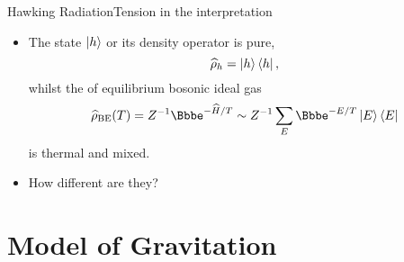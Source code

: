 \documentclass{beamer}
\newcommand{\ee}{{\Bbbe}}
\newcommand{\rfun}[2]{{#1}\mathopen{}\left(#2\right)\mathclose{}}
\newcommand{\what}[1]{{\widehat{#1}}}
\begin{document}
\begin{frame}{Hawking Radiation}{Tension in the interpretation}
\begin{itemize}
\item The state $\Ket{h}$ or its density operator is \alert{pure},
\begin{equation}
\what{\rho}_h = \Ket{h}\Bra{h},
\end{equation}
whilst the of equilibrium bosonic ideal gas
\begin{equation}
\rfun{\what{\rho}_\text{BE}}{T} = {Z}^{-1} \ee^{-\what{H}/T}
\sim Z^{-1} \sum_E \ee^{-E/T} \Ket{E}\Bra{E}
\end{equation}
is \alert{thermal} and \alert{mixed}.
\item How different are they? %
\end{itemize}
\end{frame}

\section{Model of Gravitation}
\end{document}
